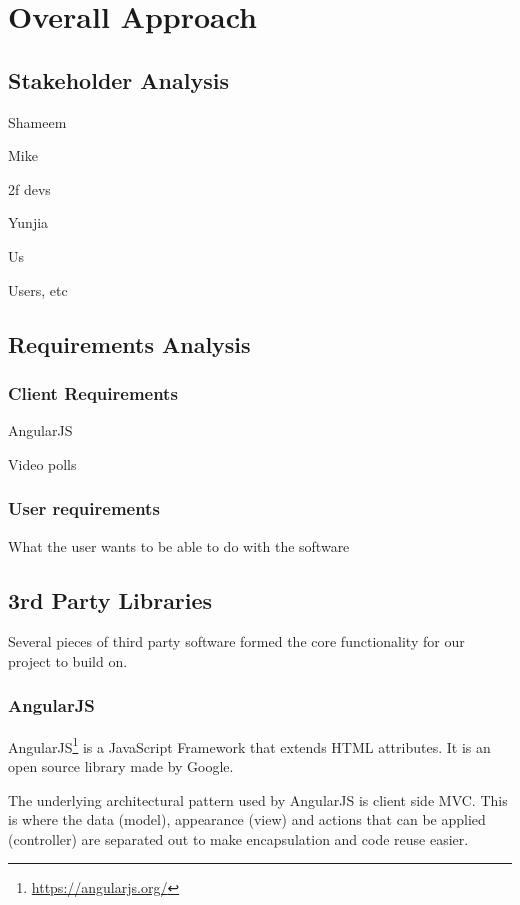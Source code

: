 \chapter{Overall Approach} 
\label{Chapter:Overall Approach}


\section{Stakeholder Analysis}

Shameem

Mike

2f devs

Yunjia

Us

Users, etc

\section{Requirements Analysis}

\subsection{Client Requirements}

AngularJS

Video polls

\subsection{User requirements}

What the user wants to be able to do with the software

\section{3rd Party Libraries}
Several pieces of third party software formed the core functionality for our project to build on.

\subsection{AngularJS}
\label{Section:AngularJS}
\gls{AngularJS}\footnote{\url{https://angularjs.org/}} is a JavaScript Framework that extends HTML attributes. It is an open source library made by Google.

The underlying architectural pattern used by \gls{AngularJS} is client side \gls{MVC}. This is where the data (model), appearance (view) and actions that can be applied (controller) are separated out to make encapsulation and code reuse easier. 

